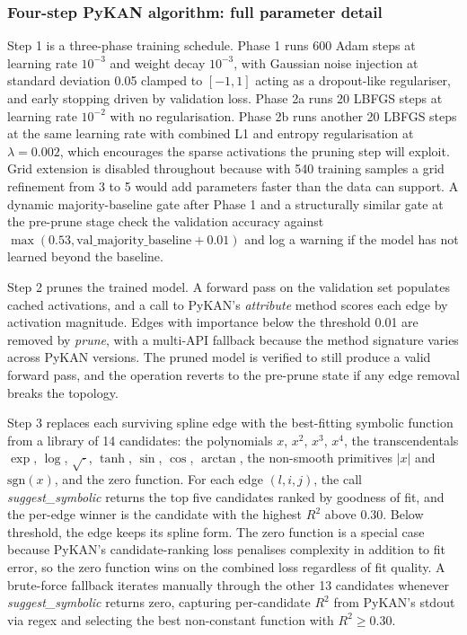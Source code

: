 \documentclass[12pt,a4paper,oneside]{article}
\begin{document}
\subsubsection{Four-step PyKAN algorithm: full parameter detail}\label{app:symbolic_algorithm}

Step 1 is a three-phase training schedule. Phase 1 runs 600 Adam steps at learning rate $10^{-3}$ and weight decay $10^{-3}$, with Gaussian noise injection at standard deviation 0.05 clamped to $[-1, 1]$ acting as a dropout-like regulariser, and early stopping driven by validation loss. Phase 2a runs 20 LBFGS steps at learning rate $10^{-2}$ with no regularisation. Phase 2b runs another 20 LBFGS steps at the same learning rate with combined L1 and entropy regularisation at $\lambda = 0.002$, which encourages the sparse activations the pruning step will exploit. Grid extension is disabled throughout because with 540 training samples a grid refinement from 3 to 5 would add parameters faster than the data can support. A dynamic majority-baseline gate after Phase 1 and a structurally similar gate at the pre-prune stage check the validation accuracy against $\max(0.53, \text{val\_majority\_baseline} + 0.01)$ and log a warning if the model has not learned beyond the baseline.

Step 2 prunes the trained model. A forward pass on the validation set populates cached activations, and a call to PyKAN's \textit{attribute} method scores each edge by activation magnitude. Edges with importance below the threshold 0.01 are removed by \textit{prune}, with a multi-API fallback because the method signature varies across PyKAN versions. The pruned model is verified to still produce a valid forward pass, and the operation reverts to the pre-prune state if any edge removal breaks the topology.

Step 3 replaces each surviving spline edge with the best-fitting symbolic function from a library of 14 candidates: the polynomials $x$, $x^2$, $x^3$, $x^4$, the transcendentals $\exp$, $\log$, $\sqrt{\cdot}$, $\tanh$, $\sin$, $\cos$, $\arctan$, the non-smooth primitives $|x|$ and $\text{sgn}(x)$, and the zero function. For each edge $(l, i, j)$, the call \textit{suggest\_symbolic} returns the top five candidates ranked by goodness of fit, and the per-edge winner is the candidate with the highest $R^2$ above 0.30. Below threshold, the edge keeps its spline form. The zero function is a special case because PyKAN's candidate-ranking loss penalises complexity in addition to fit error, so the zero function wins on the combined loss regardless of fit quality. A brute-force fallback iterates manually through the other 13 candidates whenever \textit{suggest\_symbolic} returns zero, capturing per-candidate $R^2$ from PyKAN's stdout via regex and selecting the best non-constant function with $R^2 \geq 0.30$.
\end{document}
